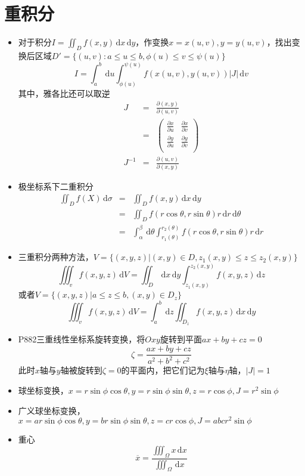 \documentclass[UTF8]{ctexart}
\newcommand{\ud}{\,\mathrm{d}}
\begin{document}
\section{重积分}
\begin{itemize}
\item 对于积分$I=\iint_D f(x,y)\ud x\ud y$，作变换$x=x(u,v),y=y(u,v)$，找出变换后区域$D'=\{(u,v):a\leq u\leq b,\phi(u)\leq v\leq \psi(u)\}$
\[
I=\int_a^b\ud u\int_{\phi(u)}^{\psi(u)} f(x(u,v),y(u,v))|J|\ud v
\]
其中，雅各比还可以取逆
\begin{eqnarray*}
J&=&\frac{\partial(x,y)}{\partial(u,v)}\\
&=& \left(
\begin{array}{cc}
\frac{\partial x}{\partial u}&\frac{\partial x}{\partial v}\\
\frac{\partial y}{\partial u}&\frac{\partial y}{\partial v}\\
\end{array}
\right)\\
J^{-1}&=&\frac{\partial(u,v)}{\partial(x,y)}
\end{eqnarray*}

\item 极坐标系下二重积分
\begin{eqnarray*}
\iint_D f(X)\ud \sigma&=&\iint_D f(x,y)\ud x\ud y\\
&=&\iint_D f(r\cos \theta,r\sin \theta)r\ud r\ud \theta\\
&=&\int_\alpha^\beta \ud \theta \int_{r_1(\theta)}^{r_2(\theta)} f(r\cos \theta,r\sin \theta)r\ud r
\end{eqnarray*}

\item 三重积分两种方法，$V=\{(x,y,z)|(x,y)\in D,z_1(x,y)\leq z \leq z_2(x,y) \}$
\[
\iiint_v f(x,y,z)\ud V = \iint_D \ud x\ud y\int_{z_1(x,y)}^{z_2(x,y)} f(x,y,z)\ud z
\]
或者$V=\{(x,y,z)|a\leq z \leq b,(x,y)\in D_z \}$
\[
\iiint_v f(x,y,z)\ud V = \int_a^b \ud z \iint_{D_z}f(x,y,z)\ud x\ud y
\]

\item P882三重线性坐标系旋转变换，将$Oxy$旋转到平面$ax+by+cz=0$
\[
\zeta = \frac{ax+by+cz}{a^2+b^2+c^2}
\]
此时$x$轴与$y$轴被旋转到$\zeta=0$的平面内，把它们记为$\xi$轴与$\eta$轴，$|J|=1$

\item 球坐标变换，$x=r\sin\phi\cos\theta,y=r\sin\phi\sin\theta,z=r\cos\phi,J=r^2\sin\phi$

\item 广义球坐标变换，$x=ar\sin\phi\cos\theta,y=br\sin\phi\sin\theta,z=cr\cos\phi,J=abcr^2\sin\phi$

\item 重心
\[
\overline{x} = \frac{\iiint_{\Omega} x \ud x}{\iiint_{\Omega} \ud x}
\]

\end{itemize}
\end{document}
